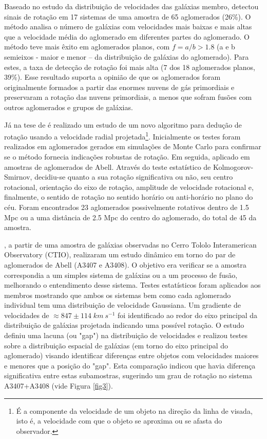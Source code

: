 Baseado no estudo da distribuição de velocidades das galáxias membro,  detectou
sinais de rotação em 17 sistemas de uma amostra de 65 aglomerados (26\%).
O método analisa o número de galáxias com velocidades mais baixas e mais altas que a velocidade média do aglomerado em diferentes partes do aglomerado. O método teve mais êxito em aglomerados planos, com $f=a/b > 1.8$ (a e b semieixos - maior e menor – da distribuição de galáxias do aglomerado). 
Para estes, a taxa de detecção de rotação foi mais alta (7 dos 18 aglomerados planos, 39\%).  Esse resultado suporta a opinião de que os aglomerados foram originalmente formados a partir das enormes nuvens de gás primordiais e preservaram a rotação das nuvens primordiais, a menos que sofram fusões com outros aglomerados e grupos de galáxias. 

Já na tese de  é realizado um estudo de um novo algoritmo para dedução de rotação usando a velocidade radial projetada\footnote{É a componente da velocidade de um objeto na direção da linha de visada, isto é, a velocidade com que o objeto se aproxima ou se afasta do observador.}. Inicialmente os testes foram realizados em aglomerados gerados em simulações de Monte Carlo para confirmar se o método fornecia indicações robustas de rotação. Em seguida, aplicado em amostras de aglomerados de Abell. Através do teste estatístico de Kolmogorov-Smirnov, decidiu-se quanto a sua rotação significativa ou não, seu centro rotacional, orientação do eixo de rotação, amplitude de velocidade rotacional e, finalmente, o sentido de rotação no sentido horário ou anti-horário no plano do céu. Foram encontrados 23 aglomerados possivelmente rotativos dentro de 1.5 Mpc ou a uma distância de 2.5 Mpc do centro do aglomerado, do total de 45 da amostra.

, a partir de uma amostra de galáxias observadas no Cerro Tololo Interamerican Observatory (CTIO), realizaram um estudo dinâmico em torno do par de aglomerados de Abell (A3407 e A3408). O objetivo era verificar se a amostra correspondia a um simples sistema de galáxias ou a um processo de fusão, melhorando o entendimento desse sistema. Testes estatísticos foram aplicados aos membros mostrando que ambos os sistemas bem como cada aglomerado individual tem uma distribuição de velocidade Gaussiana. Um gradiente de velocidades de $\approx 847 \pm 114\; {km~s^{-1}}$ foi identificado ao redor do eixo principal da distribuição de galáxias projetada indicando uma possível rotação. 
O estudo definiu uma lacuna (ou "gap") na distribuição de velocidades e realizou testes sobre a distribuição espacial de galáxias (em torno do eixo principal do aglomerado) visando identificar diferenças entre objetos com velocidades maiores e menores que a posição do "gap". Esta comparação indicou que havia diferença significativa entre estas subamostras, sugerindo um grau de rotação no sistema A3407+A3408 (vide Figura \ref{fig3}).

